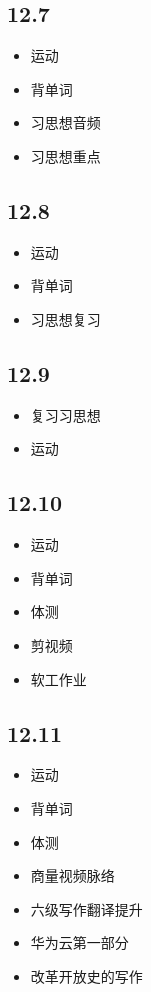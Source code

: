 \documentclass[UTF8]{ctexart}
\begin{document}
\subsection*{12.7}
\begin{itemize}
    \item 运动
    \item 背单词
    \item 习思想音频
    \item 习思想重点
\end{itemize}

\subsection*{12.8}
\begin{itemize}
    \item 运动
    \item 背单词
    \item 习思想复习
\end{itemize}

\subsection*{12.9}
\begin{itemize}
    \item 复习习思想
    \item 运动
\end{itemize}

\subsection*{12.10}
\begin{itemize}
    \item 运动
    \item 背单词
    \item 体测
    \item 剪视频
    \item 软工作业
\end{itemize}

\subsection*{12.11}
\begin{itemize}
    \item 运动
    \item 背单词
    \item 体测
    \item 商量视频脉络
    \item 六级写作翻译提升
    \item 华为云第一部分
    \item 改革开放史的写作
\end{itemize}
\end{document}
